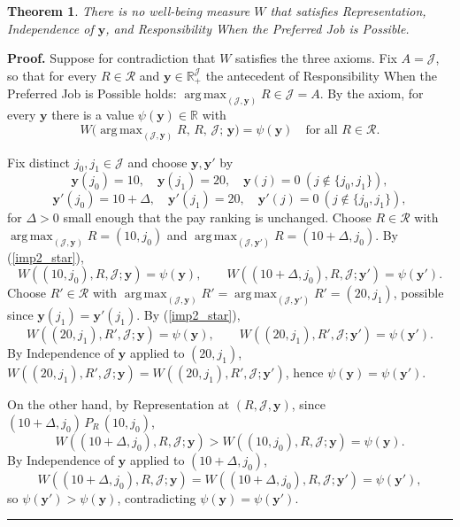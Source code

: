 \documentclass[12pt,thmsb]{article}
\DeclareMathOperator*{\argmax}{arg\,max}
\newtheorem{theorem}{Theorem}
\newenvironment{proof}[1][Proof]{\noindent \textbf{#1.} }{\  \rule{0.5em}{0.5em}}
\begin{document}
\begin{theorem}
\label{thm:imp2}
There is no well-being measure $W$ that satisfies Representation, Independence
of $\mathbf y$, and Responsibility When the Preferred Job is Possible.
\end{theorem}

\begin{proof}
Suppose for contradiction that $W$ satisfies the three axioms. Fix
$A=\mathcal J$, so that for every $R\in\mathcal R$ and $\mathbf
y\in\mathbb R_+^{\mathcal J}$ the antecedent of Responsibility When the
Preferred Job is Possible holds: $\argmax_{(\mathcal
J,\mathbf y)}R\in\mathcal J=A$. By the axiom, for every $\mathbf y$ there is a
value $\psi(\mathbf y)\in\mathbb R$ with
\begin{equation}
W\!\big(\argmax_{(\mathcal J,\mathbf y)}R,\,R,\,\mathcal J;\,\mathbf y\big)
=\psi(\mathbf y)\quad\text{for all }R\in\mathcal R. \label{imp2_star}
\end{equation}

Fix distinct $j_0,j_1\in\mathcal J$ and choose $\mathbf y,\mathbf y'$ by
\begin{equation*}
\mathbf y(j_0)=10,\quad \mathbf y(j_1)=20,\quad \mathbf y(j)=0\ (j\notin\{j_0,j_1\}),
\end{equation*}
\begin{equation*}
\mathbf y'(j_0)=10+\Delta,\quad \mathbf y'(j_1)=20,\quad \mathbf y'(j)=0\ (j\notin\{j_0,j_1\}),
\end{equation*}
for $\Delta>0$ small enough that the pay ranking is unchanged. Choose
$R\in\mathcal R$ with $\argmax_{(\mathcal J,\mathbf y)}R=(10,j_0)$ and
$\argmax_{(\mathcal J,\mathbf y')}R=(10+\Delta,j_0)$. By (\ref{imp2_star}),
\begin{equation*}
W((10,j_0),R,\mathcal J;\mathbf y)=\psi(\mathbf y),\qquad
W((10+\Delta,j_0),R,\mathcal J;\mathbf y')=\psi(\mathbf y').
\end{equation*}
Choose $R'\in\mathcal R$ with $\argmax_{(\mathcal
J,\mathbf y)}R'=\argmax_{(\mathcal J,\mathbf y')}R'=(20,j_1)$, possible since
$\mathbf y(j_1)=\mathbf y'(j_1)$. By (\ref{imp2_star}),
\begin{equation*}
W((20,j_1),R',\mathcal J;\mathbf y)=\psi(\mathbf y),\qquad
W((20,j_1),R',\mathcal J;\mathbf y')=\psi(\mathbf y').
\end{equation*}
By Independence of $\mathbf y$ applied to $(20,j_1)$,
$W((20,j_1),R',\mathcal J;\mathbf y)=W((20,j_1),R',\mathcal J;\mathbf y')$, hence
$\psi(\mathbf y)=\psi(\mathbf y')$.

On the other hand, by Representation at $(R,\mathcal J,\mathbf y)$, since
$(10+\Delta,j_0)\,P_R\,(10,j_0)$,
\begin{equation*}
W((10+\Delta,j_0),R,\mathcal J;\mathbf y)>W((10,j_0),R,\mathcal J;\mathbf y)
=\psi(\mathbf y).
\end{equation*}
By Independence of $\mathbf y$ applied to $(10+\Delta,j_0)$,
\begin{equation*}
W((10+\Delta,j_0),R,\mathcal J;\mathbf y)
=W((10+\Delta,j_0),R,\mathcal J;\mathbf y')=\psi(\mathbf y'),
\end{equation*}
so $\psi(\mathbf y')>\psi(\mathbf y)$, contradicting $\psi(\mathbf
y)=\psi(\mathbf y')$.
\end{proof}
\end{document}
